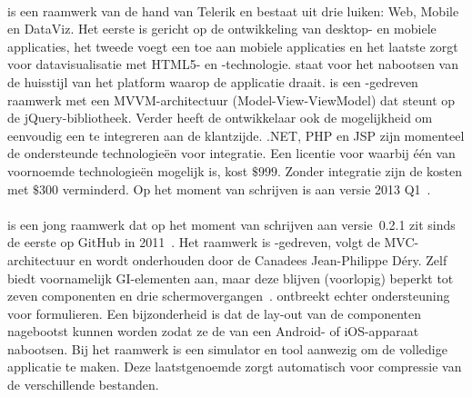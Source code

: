 \paragraph{\kendo} %
\kendo{} is een raamwerk van de hand van Telerik en bestaat uit drie luiken:  Web, Mobile en DataViz.
Het eerste is gericht op de ontwikkeling van desktop- en mobiele applicaties,  het tweede voegt een  toe aan mobiele applicaties en het laatste zorgt voor datavisualisatie met HTML5- en \js{}-technologie.
 staat voor het nabootsen van de huisstijl van het platform waarop de applicatie draait.
\kendo{} is een \js{}-gedreven raamwerk met een MVVM-architectuur (Model-View-ViewModel) dat steunt op de jQuery-bibliotheek.
Verder heeft de ontwikkelaar ook de mogelijkheid om eenvoudig een  te integreren aan de klantzijde.
.NET,  PHP en JSP zijn momenteel de ondersteunde technologieën voor  integratie.
Een licentie voor \kendo{} waarbij één van voornoemde technologieën mogelijk is, kost $\$999$.
Zonder  integratie zijn de kosten met $\$300$ verminderd.
Op het moment van schrijven is \kendo{} aan versie 2013 Q1~\cite{Telerik}.

\paragraph{\moobile} %
\moobile{} is een jong raamwerk dat op het moment van schrijven aan versie~0.2.1 zit sinds de eerste  op GitHub in 2011~\cite{Dery2013}.
Het raamwerk is \js{}-gedreven, volgt de MVC-architectuur en wordt onderhouden door de Canadees Jean-Philippe Déry.
Zelf biedt \moobile{} voornamelijk GI-elementen aan, maar deze blijven (voorlopig) beperkt tot zeven componenten en drie schermovergangen~\cite{Dery2013}.
\moobile{} ontbreekt echter ondersteuning voor formulieren.
Een bijzonderheid is dat de lay-out van de componenten nagebootst kunnen worden zodat ze de  van een Android- of iOS-apparaat nabootsen.
Bij het raamwerk is een simulator en tool aanwezig om de volledige applicatie te maken.
Deze laatstgenoemde zorgt automatisch voor compressie van de verschillende bestanden.

